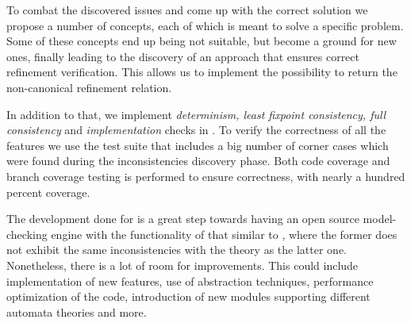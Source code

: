 To combat the discovered issues and come up with the correct solution we propose a number of concepts, each of which is meant to solve a specific problem. Some of these concepts end up being not suitable, but become a ground for new ones, finally leading to the discovery of an approach that ensures correct refinement verification. This allows us to implement the possibility to return the non-canonical refinement relation.

In addition to that, we implement \textit{determinism, least fixpoint consistency, full consistency} and \textit{implementation} checks in \jecdar. To verify the correctness of all the features we use the test suite that includes a big number of corner cases which were found during the inconsistencies discovery phase. Both code coverage and branch coverage testing is performed to ensure correctness, with nearly a hundred percent coverage.

The development done for  is a great step towards having an open source model-checking engine with the functionality of that similar to , where the former does not exhibit the same inconsistencies with the theory as the latter one. Nonetheless, there is a lot of room for improvements. This could include implementation of new features, use of abstraction techniques, performance optimization of the code, introduction of new modules supporting different automata theories and more.

\newpage